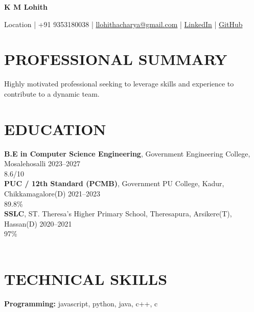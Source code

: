 \documentclass[10pt,a4paper]{extarticle}
\begin{document}

\begin{center}

{\Large \textbf{K M Lohith}}

\vspace{1pt}

Location |
+91 9353180038 |
\href{mailto:llohithacharya@gmail.com}{llohithacharya@gmail.com} |
\href{https://linkedin.com/in/username}{LinkedIn} |
\href{https://github.com/username}{GitHub}

\end{center}


\section*{PROFESSIONAL SUMMARY}

Highly motivated professional seeking to leverage skills and experience to contribute to a dynamic team.
\\


\section*{EDUCATION}

\noindent \textbf{B.E in Computer Science Engineering}, Government Engineering College, Mosalehosalli \hfill 2023–2027\\
\null \hfill 8.6/10\\
\noindent \textbf{PUC / 12th Standard (PCMB)}, Government PU College, Kadur, Chikkamagalore(D) \hfill 2021–2023\\
\null \hfill 89.8\%\\
\noindent \textbf{SSLC}, ST. Theresa’s Higher Primary School, Theresapura, Arsikere(T), Hassan(D) \hfill 2020–2021\\
\null \hfill 97\%\\


\\

\section*{TECHNICAL SKILLS}

\textbf{Programming:} javascript, python, java, c++, c
\end{document}
